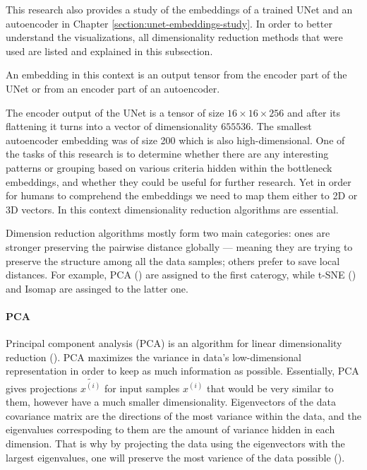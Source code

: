 This research also provides a study of the embeddings of a trained UNet and an autoencoder in Chapter \ref{section:unet-embeddings-study}. In order to better understand the visualizations, all dimensionality reduction methods that were used are listed and explained in this subsection.

\begin{definition}[Embedding]
    An embedding in this context is an output tensor from the encoder part of the UNet or from an encoder part of an autoencoder.
\end{definition}

The encoder output of the UNet is a tensor of size $16 \times 16 \times 256$ and after its flattening it turns into a vector of dimensionality $655536$. The smallest autoencoder embedding was of size 200 which is also high-dimensional. One of the tasks of this research is to determine whether there are any interesting patterns or grouping based on various criteria hidden within the bottleneck embeddings, and whether they could be useful for further research. Yet in order for humans to comprehend the embeddings we need to map them either to 2D or 3D vectors. In this context dimensionality reduction algorithms are essential.

Dimension reduction algorithms mostly form two main categories: ones are stronger preserving the pairwise
distance globally --- meaning they are trying to preserve the structure among all the data samples; others prefer to save local distances. For example, PCA (\cite{Hotelling_1933}) are assigned to the first caterogy, while t-SNE (\cite{tsne}) and Isomap are assinged to the latter one.

\paragraph{PCA}
Principal component analysis (PCA) is an algorithm for linear dimensionality reduction (\cite{Pearson_1901}).  PCA maximizes the variance in data's low-dimensional representation in order to keep as much information as possible. Essentially, PCA gives projections $\tilde{x^{(i)}}$ for input samples $x^{(i)}$ that would be very similar to them, however have a much smaller dimensionality. Eigenvectors of the data covariance matrix are the directions of the most variance within the data, and the eigenvalues correspoding to them are the amount of variance hidden in each dimension. That is why by projecting the data using the eigenvectors with the largest eigenvalues, one will preserve the most varience of the data possible (\cite{mml_book}).

